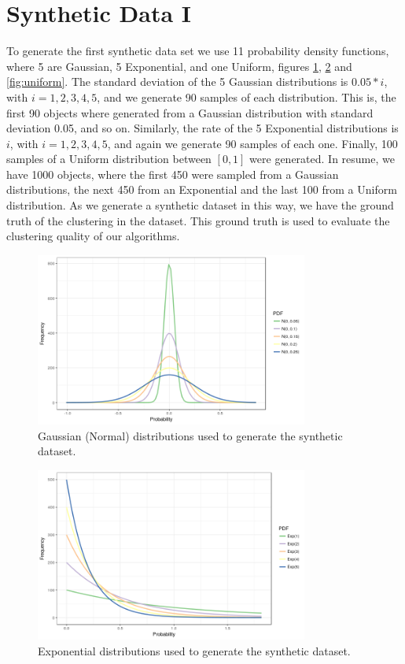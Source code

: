 \section{Synthetic Data I}\label{sec:synthetic_I}
To generate the first synthetic data set we use 11 probability density functions, where 5 are Gaussian, 5 Exponential, and one Uniform, figures \ref{fig:5_gaussian}, \ref{fig:5_exp} and \ref{fig:uniform}. The standard deviation of the 5 Gaussian distributions is $0.05*i$, with $i=1, 2, 3, 4, 5$, and we generate 90 samples of each distribution. This is, the first 90 objects where generated from a Gaussian distribution with standard deviation 0.05, and so on. Similarly, the rate of the 5 Exponential distributions is $i$, with $i=1, 2, 3, 4, 5$, and again we generate 90 samples of each one. Finally, 100 samples of a Uniform distribution between $[0, 1]$ were generated. In resume, we have 1000 objects, where the first 450 were sampled from a Gaussian distributions, the next 450 from an Exponential and the last 100 from a Uniform distribution. As we generate a synthetic dataset in this way, we have the ground truth of the clustering in the dataset. This ground truth is used to evaluate the clustering quality of our algorithms.

\begin{figure}[H]
    \centering
    \includegraphics[width=0.8\textwidth]{img/gld_clustering/extra_images/5_gaussian.png}
    \caption{Gaussian (Normal) distributions used to generate the synthetic dataset.}
    \label{fig:5_gaussian}
\end{figure}

\begin{figure}[H]
    \centering
    \includegraphics[width=0.8\textwidth]{img/gld_clustering/extra_images/5_exp.png}
    \caption{Exponential distributions used to generate the synthetic dataset.}
    \label{fig:5_exp}
\end{figure}

